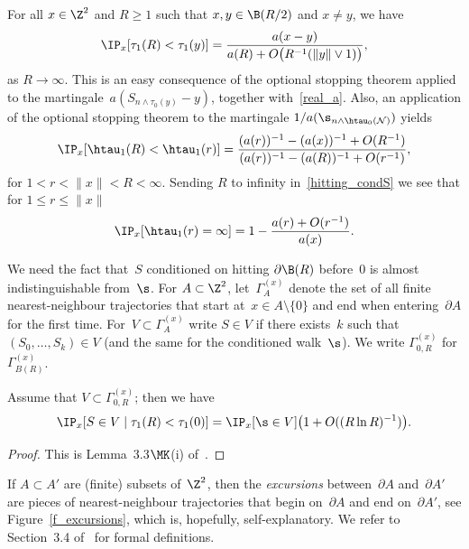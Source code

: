 For all $x \in \Z^2$ and $R\geq 1$ such that $x,y \in \B(R/2)$ and $x\neq y$, we have
\begin{equation}\label{nothit_r_dim2}
\IP_x[\tau_1(R)< \tau_1(y)] =
\frac{a(x-y)}{a(R)+O\big(R^{-1}(\|y\|\vee 1)\big)},
\end{equation}
as $R\to \infty$. This is an easy consequence of the optional stopping theorem applied to the martingale~$a(S_{n\wedge\tau_0(y)}-y)$, together with~\eqref{real_a}. Also, an application of the optional stopping theorem to the martingale $1/a(\s_{n\wedge \htau_0(\mathcal{N})})$ yields
\begin{equation}\label{hitting_condS}
\IP_x[\htau_1(R)<\htau_1(r)] = \frac{(a(r))^{-1}-(a(x))^{-1}+O(R^{-1})} {(a(r))^{-1}-(a(R))^{-1}+O(r^{-1})},
\end{equation}
for $1<r<\|x\|<R<\infty$. Sending $R$ to infinity in~\eqref{hitting_condS} we see that for $1\leq r\leq \|x\|$
\begin{equation}\label{escape_condS}
\IP_x[\htau_1(r)=\infty] = 1-\frac{a(r)+O(r^{-1})}{a(x)}.
\end{equation}

We need the fact that~$S$ conditioned on hitting $\partial\B(R)$ before~$0$ is almost indistinguishable from~$\s$. For $A \subset \Z^2$, let~$\Gamma^{(x)}_A$ denote the set of all finite nearest-neighbour trajectories that start at~$x\in A\setminus\{0\}$ and end when entering~$\partial A$ for the first time. For~$V\subset \Gamma^{(x)}_A$ write $S\in V$ if there exists~$k$ such that $(S_0,\ldots,S_k)\in V$ (and the same for the conditioned walk~$\s$). We write $\Gamma^{(x)}_{0,R}$ for $\Gamma^{(x)}_{B(R)}$.

\begin{lemm}\label{l_relation_S_hatS}
Assume that $V\subset \Gamma^{(x)}_{0,R}$; then we have
\begin{equation}\label{eq_relation_S_hatS}
\IP_x[S\in V\mid \tau_1(R)< \tau_1(0)] =\IP_x[\s \in V] \big(1+O((R \ln R)^{-1})\big).
\end{equation}
\end{lemm}

\begin{proof}
This is Lemma~3.3$\MK$(i) of~\cite{CPV16}.
\end{proof}

If $A\subset A'$ are (finite) subsets of~$\Z^2$, then the \emph{excursions} between~$\partial A$ and~$\partial A'$ are pieces of nearest-neighbour trajectories that begin on~$\partial A$ and end on~$\partial A'$, see Figure~\ref{f_excursions}, which is, hopefully, self-explanatory. We refer to Section~3.4 of~\cite{CPV16} for formal definitions.

